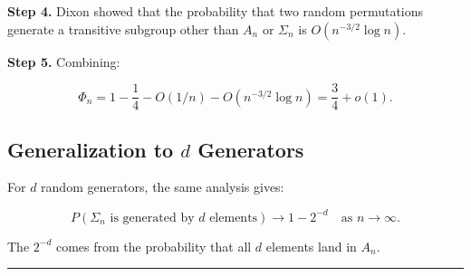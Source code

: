 \documentclass[12pt,a4paper]{article}
\begin{document}
\textbf{Step 4.} Dixon showed that the probability that two random permutations generate
a transitive subgroup other than $A_n$ or $Σ_n$ is $O(n^{-3/2}\log n)$.

\textbf{Step 5.} Combining:


\[Φ_n = 1 - \frac{1}{4} - O(1/n) - O(n^{-3/2}\log n) = \frac{3}{4} + o(1).\]

\subsection{Generalization to $d$ Generators}

For $d$ random generators, the same analysis gives:

\[P(Σ_n \text{ is generated by } d \text{ elements}) \to 1 - 2^{-d} \quad \text{as } n \to \infty.\]

The $2^{-d}$ comes from the probability that all $d$ elements land in $A_n$.

\begin{center}
\rule{0.5\textwidth}{0.4pt}
\end{center}
\end{document}
